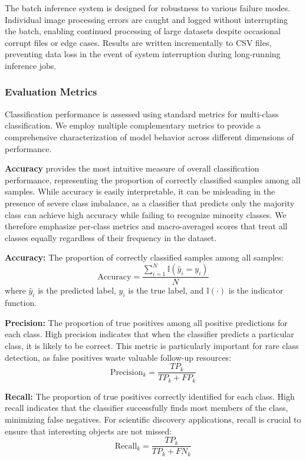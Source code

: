 \documentclass[11pt,a4paper]{article}
\begin{document}
The batch inference system is designed for robustness to various failure modes. Individual image processing errors are caught and logged without interrupting the batch, enabling continued processing of large datasets despite occasional corrupt files or edge cases. Results are written incrementally to CSV files, preventing data loss in the event of system interruption during long-running inference jobs.

\subsubsection{Evaluation Metrics}

Classification performance is assessed using standard metrics for multi-class classification. We employ multiple complementary metrics to provide a comprehensive characterization of model behavior across different dimensions of performance.

\textbf{Accuracy} provides the most intuitive measure of overall classification performance, representing the proportion of correctly classified samples among all samples. While accuracy is easily interpretable, it can be misleading in the presence of severe class imbalance, as a classifier that predicts only the majority class can achieve high accuracy while failing to recognize minority classes. We therefore emphasize per-class metrics and macro-averaged scores that treat all classes equally regardless of their frequency in the dataset.

\textbf{Accuracy:} The proportion of correctly classified samples among all samples:
\begin{equation}
    \text{Accuracy} = \frac{\sum_{i=1}^{N} \mathbb{I}(\hat{y}_i = y_i)}{N}
\end{equation}
where $\hat{y}_i$ is the predicted label, $y_i$ is the true label, and $\mathbb{I}(\cdot)$ is the indicator function.

\textbf{Precision:} The proportion of true positives among all positive predictions for each class. High precision indicates that when the classifier predicts a particular class, it is likely to be correct. This metric is particularly important for rare class detection, as false positives waste valuable follow-up resources:
\begin{equation}
    \text{Precision}_k = \frac{TP_k}{TP_k + FP_k}
\end{equation}

\textbf{Recall:} The proportion of true positives correctly identified for each class. High recall indicates that the classifier successfully finds most members of the class, minimizing false negatives. For scientific discovery applications, recall is crucial to ensure that interesting objects are not missed:
\begin{equation}
    \text{Recall}_k = \frac{TP_k}{TP_k + FN_k}
\end{equation}
\end{document}
